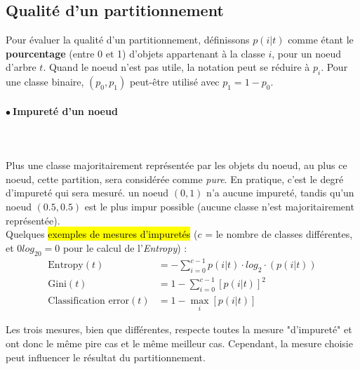 \documentclass[letterpaper, 12pt]{article}
\newcommand{\alinea}{
\hspace*{0.5cm}}
\newcommand{\point}{$\bullet\ $}
\begin{document}
		\subsection{Qualité d'un partitionnement}\label{sec:tree:split}
			\alinea Pour évaluer la qualité d'un partitionnement, définissons
				$p(i|t)$ comme étant le \textbf{pourcentage} (entre 0 et 1)
				d'objets appartenant à
				la classe $i$, pour un noeud d'arbre $t$. Quand le noeud
				n'est pas utile, la notation peut se réduire à $p_i$.
				Pour une classe binaire, $(p_0, p_1)$ peut-être utilisé
				avec $p_1 = 1 - p_0$.
			\paragraph{\point Impureté d'un noeud}~\\~\\
			\alinea Plus une classe majoritairement représentée par les 
				objets du noeud, au plus ce noeud, cette partition, sera
				considérée comme \textit{pure}. En pratique, c'est le degré
				d'impureté qui sera mesuré. un noeud $(0, 1)$ n'a aucune 
				impureté, tandis qu'un noeud $(0.5, 0.5)$ est le plus impur
				possible (aucune classe n'est majoritairement représentée).\\
			\alinea Quelques \hl{exemples de mesures d'impuretés} ($c$
				= le nombre de classes différentes, et $0log_20 = 0$
				pour le calcul de l'\textit{Entropy}) :
			\begin{align*}
				\text{Entropy}(t) &= -\sum^{c-1}_{i=0} p(i|t) 
					\cdot log_2 \cdot (p(i|t))\\
				\text{Gini}(t)    &= 1- \sum^{c-1}_{i=0}[p(i|t)]^2\\
				\text{Classification error}(t) &= 1-\max_{i}[p(i|t)]
			\end{align*}
			\alinea Les trois mesures, bien que différentes, respecte
				toutes la mesure "d'impureté" et ont donc le même pire cas
				et le même meilleur cas. Cependant, la mesure choisie peut
				influencer le résultat du partitionnement.
\end{document}
